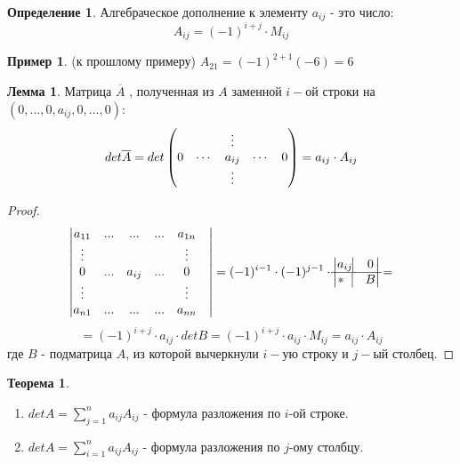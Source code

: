 \documentclass[a4paper, 12pt]{article}
\newcommand\tab[1][.5cm]{\hspace*{#1}}
\newcounter{thcount}
\theoremstyle{definition}
\newtheorem*{definition}{Определение}
\newtheorem*{lemma}{Лемма}
\newtheorem*{example1}{Пример}
\newtheorem{theoremnum}[thcount]{Теорема}
\begin{document}
  \begin{definition}
    Алгебраческое дополнение к элементу $a_{ij}$ - это число: $$A_{ij} = (-1)^{i+j} \cdot M_{ij}$$ 
  \end{definition} 
  \begin{example1}
    (к прошлому примеру) $A_{21} = (-1)^{2+1}(-6) = 6$  
  \end{example1}

  \begin{lemma}
    Матрица $\overline{A}$ , полученная из $A$ заменной $i-$ой строки на \\$(0,...,0,a_{ij},0,...,0)$:
    $$det \overline{A} = det \begin{pmatrix}
      \null & \null & \vdots & \null & \null \\
      0 & \cdots & a_{ij} & \cdots & 0 \\
      \null & \null & \vdots & \null & \null \end{pmatrix} = a_{ij} \cdot A_{ij}$$  
  \end{lemma} 
  \begin{proof}
    $$\begin{vmatrix}
      a_{11} & ... & ... & ... & a_{1n} \\
      \vdots & \null & \null & \null & \vdots & \\
      0 & ... & a_{ij} & ... & 0 \\
      \vdots & \null & \null & \null & \vdots & \\
      a_{n1} &  ... & ... & ... & a_{nn}
    \end{vmatrix} = (-1)^{i-1} \cdot (-1)^{j-1} \cdot \begin{vmatrix}
      a_{ij} \vline &  0 \\
      \hline 
      * \ \ \vline & B
    \end{vmatrix} = $$ $$ =(-1)^{i+j} \cdot a_{ij}\cdot detB = (-1)^{i+j} \cdot a_{ij} \cdot M_{ij} = a_{ij}\cdot A_{ij}$$
    где $B$ - подматрица $A$, из которой вычеркнули $i-$ую строку и $j-$ый столбец.
  \end{proof} 
  \begin{theoremnum}
    \begin{enumerate} \tab
      \item $detA = \sum \limits_{j=1}^na_{ij}A_{ij}$ - формула разложения по $i$-ой строке.
      \item $detA = \sum \limits_{i=1}^na_{ij}A_{ij}$ - формула разложения по $j$-ому столбцу.
    \end{enumerate}
  \end{theoremnum} 
\end{document}
